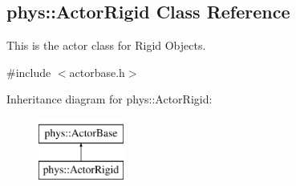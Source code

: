 \hypertarget{classphys_1_1ActorRigid}{
\subsection{phys::ActorRigid Class Reference}
\label{classphys_1_1ActorRigid}
}


This is the actor class for Rigid Objects.  




{\ttfamily \#include $<$actorbase.h$>$}

Inheritance diagram for phys::ActorRigid:\begin{figure}[H]
\begin{center}
\leavevmode
\includegraphics[height=2.000000cm]{classphys_1_1ActorRigid}
\end{center}
\end{figure}
